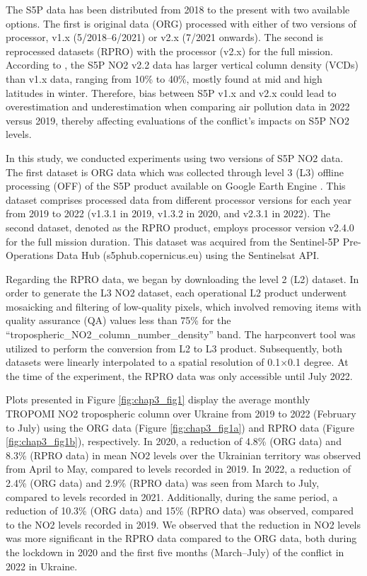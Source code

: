 The S5P data has been distributed from 2018 to the present with two available options. The first is original data (ORG) processed with either of two versions of processor, v1.x (5/2018–6/2021) or v2.x (7/2021 onwards). The second is reprocessed datasets (RPRO) with the processor (v2.x) for the full mission. According to \citep{van2022sentinel}, the S5P NO2 v2.2 data has larger vertical column density (VCDs) than v1.x data, ranging from 10\% to 40\%, mostly found at mid and high latitudes in winter. Therefore, bias between S5P v1.x and v2.x could lead to overestimation and underestimation when comparing air pollution data in 2022 versus 2019, thereby affecting evaluations of the conflict’s impacts on S5P NO2 levels.\par

In this study, we conducted experiments using two versions of S5P NO2 data. The first dataset is ORG data which was collected through level 3 (L3) offline processing (OFF) of the S5P product available on Google Earth Engine \citep{gorelick2017google}. This dataset comprises processed data from different processor versions for each year from 2019 to 2022 (v1.3.1 in 2019, v1.3.2 in 2020, and v2.3.1 in 2022). The second dataset, denoted as the RPRO product, employs processor version v2.4.0 for the full mission duration. This dataset was acquired from the Sentinel-5P Pre-Operations Data Hub (s5phub.copernicus.eu) using the Sentinelsat API.\par

Regarding the RPRO data, we began by downloading the level 2 (L2) dataset. In order to generate the L3 NO2 dataset, each operational L2 product underwent mosaicking and filtering of low-quality pixels, which involved removing items with quality assurance (QA) values less than 75\% for the \enquote{tropospheric\_NO2\_column\_number\_density} band. The harpconvert tool was utilized to perform the conversion from L2 to L3 product. Subsequently, both datasets were linearly interpolated to a spatial resolution of 0.1$\times$0.1 degree. At the time of the experiment, the RPRO data was only accessible until July 2022.\par

Plots presented in Figure \ref{fig:chap3_fig1} display the average monthly TROPOMI NO2 tropospheric column over Ukraine from 2019 to 2022 (February to July) using the ORG data (Figure \ref{fig:chap3_fig1a}) and RPRO data (Figure \ref{fig:chap3_fig1b}), respectively. In 2020, a reduction of 4.8\% (ORG data) and 8.3\% (RPRO data) in mean NO2 levels over the Ukrainian territory was observed from April to May, compared to levels recorded in 2019. In 2022, a reduction of 2.4\% (ORG data) and 2.9\% (RPRO data) was seen from March to July, compared to levels recorded in 2021. Additionally, during the same period, a reduction of 10.3\% (ORG data) and 15\% (RPRO data) was observed, compared to the NO2 levels recorded in 2019. We observed that the reduction in NO2 levels was more significant in the RPRO data compared to the ORG data, both during the lockdown in 2020 and the first five months (March–July) of the conflict in 2022 in Ukraine.\par


